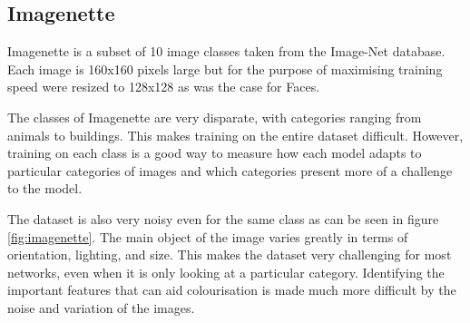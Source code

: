 \documentclass{l4proj}
\begin{document}
\subsection{Imagenette}
Imagenette is a subset of 10 image classes taken from the Image-Net database\cite{Image-Net}. Each image is 160x160 pixels large but for the purpose of maximising training speed were resized to 128x128 as was the case for Faces. 

The classes of Imagenette are very disparate, with categories ranging from animals to buildings. This makes training on the entire dataset difficult. However, training on each class is a good way to measure how each model adapts to particular categories of images and which categories present more of a challenge to the model. 

The dataset is also very noisy even for the same class as can be seen in figure \ref{fig:imagenette}. The main object of the image varies greatly in terms of orientation, lighting, and size. This makes the dataset very challenging for most networks, even when it is only looking at a particular category. Identifying the important features that can aid colourisation is made much more difficult by the noise and variation of the images.
\end{document}
